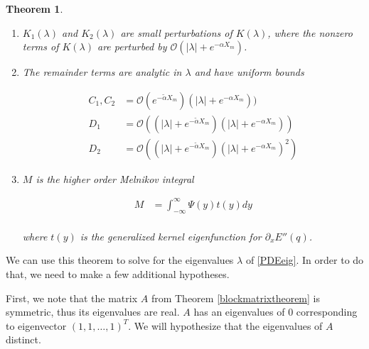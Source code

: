 \documentclass[12pt]{article}
\newtheorem{theorem}{Theorem}
\begin{document}
\begin{theorem}
\begin{enumerate}
where

\begin{align*}
a_i &= \langle \Psi(X_i), Q'(-X_i) \rangle \\
\end{align*}

$\Psi(x)$ is the exponentially localized solution to the adjoint variational equation \eqref{adjvareq2} defined in Lemma \ref{varadjsolutions}. $Q(x) = (q(x), \partial_x q(x), \dots, \partial_x^{2m}q(x))$, where $q(x)$ is the symmetric primary pulse solution from Hypothesis \ref{qexistshyp}.\\

\item $K_1(\lambda)$ and $K_2(\lambda)$ are small perturbations of $K(\lambda)$, where the nonzero terms of $K(\lambda)$ are perturbed by $\mathcal{O}(|\lambda| + e^{-\alpha X_m})$.

\item The remainder terms are analytic in $\lambda$ and have uniform bounds

\begin{align*}
C_1, C_2 &= \mathcal{O}(e^{-\tilde{\alpha}X_m})(|\lambda| + e^{-\alpha X_m})) \\
D_1 &= \mathcal{O}((|\lambda| + e^{-\tilde{\alpha} X_m})(|\lambda| + e^{-\alpha X_m})) \\
D_2 &= \mathcal{O}((|\lambda| + e^{-\tilde{\alpha} X_m})(|\lambda| + e^{-\alpha X_m})^2)
\end{align*}

\item $M$ is the higher order Melnikov integral

\begin{align*}
M &= \int_{-\infty}^\infty \Psi(y) t(y) dy \\
\end{align*}

where $t(y)$ is the generalized kernel eigenfunction for $\partial_x E''(q)$.
\end{enumerate}
\end{theorem}

We can use this theorem to solve for the eigenvalues $\lambda$ of \eqref{PDEeig}. In order to do that, we need to make a few additional hypotheses.

First, we note that the matrix $A$ from Theorem \ref{blockmatrixtheorem} is symmetric, thus its eigenvalues are real. $A$ has an eigenvalues of 0 corresponding to eigenvector $(1, 1, \dots, 1)^T$. We will hypothesize that the eigenvalues of $A$ distinct. 
\end{document}
